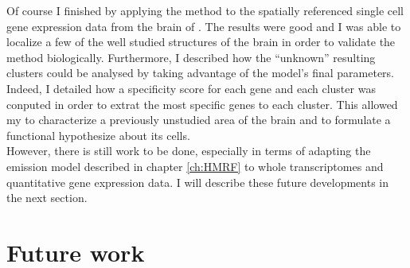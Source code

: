  Of course I finished by applying the method to the spatially referenced single cell gene expression data from the brain of \platyfull{}. The results were good and I was able to localize a few of the well studied structures of the brain in order to validate the method biologically. Furthermore, I described how the ``unknown'' resulting clusters could be analysed by taking advantage of the model's final parameters. Indeed, I detailed how a specificity score for each gene and each cluster was conputed in order to extrat the most specific genes to each cluster. This allowed my to characterize a previously unstudied area of the brain and to formulate a functional hypothesize about its cells.\\
 
 
  However, there is still work to be done, especially in terms of adapting the emission model described in chapter \ref{ch:HMRF} to whole transcriptomes and quantitative gene expression data. I will describe these future developments in the next section.\\
  
  \section{Future work}




	



